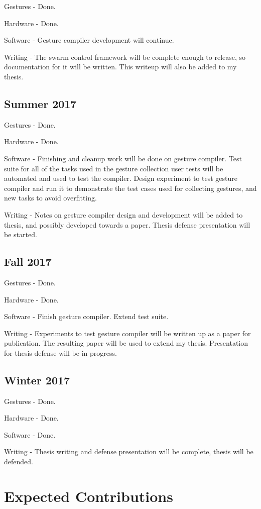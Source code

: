 \documentclass[]{article}
\begin{document}
Gestures - Done. 

Hardware - Done. 

Software - Gesture compiler development will continue.  

Writing - The swarm control framework will be complete enough to release, so documentation for it will be written. This writeup will also be added to my thesis. 

\subsection{Summer 2017}

Gestures - Done. 

Hardware - Done. 

Software - Finishing and cleanup work will be done on gesture compiler. Test suite for all of the tasks used in the gesture collection user tests will be automated and used to test the compiler. Design experiment to test gesture compiler and run it to demonstrate the test cases used for collecting gestures, and new tasks to avoid overfitting. 

Writing - Notes on gesture compiler design and development will be added to thesis, and possibly developed towards a paper. Thesis defense presentation will be started. 

\subsection{Fall 2017}

Gestures - Done. 

Hardware - Done. 

Software - Finish gesture compiler. Extend test suite. 

Writing - Experiments to test gesture compiler will be written up as a paper for publication. The resulting paper will be used to extend my thesis. Presentation for thesis defense will be in progress. 

\subsection{Winter 2017}

Gestures - Done. 

Hardware - Done. 

Software - Done. 

Writing - Thesis writing and defense presentation will be complete, thesis will be defended. 

\section{Expected Contributions}
\end{document}
